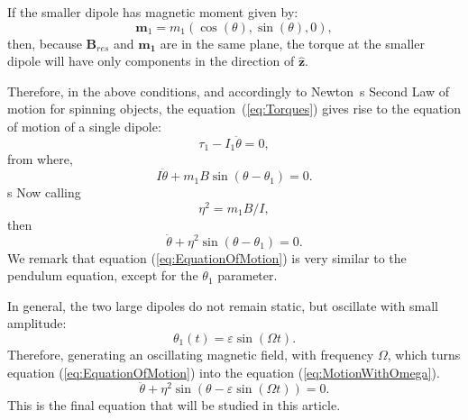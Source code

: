 If the smaller dipole has magnetic moment given by:
\begin{equation}
    \boldsymbol{m}_1 = m_1 (\cos(\theta), \sin(\theta), 0),
    \label{eq:MagneticMoment}
\end{equation}
then, because $\boldsymbol{B}_{res}$ and $\boldsymbol{m_1}$ are in the same plane, the torque at the smaller dipole will have only components in the direction of $\boldsymbol{\hat{z}}$.

Therefore, in the above conditions, and accordingly to Newton~\textquotesingle s Second Law of motion for spinning objects, the equation~(\ref{eq:Torques}) gives rise to the equation of motion of a single dipole:
\begin{equation}
        \tau_1 - I_1 \ddot{\theta} = 0,
\end{equation}
from where, 
\begin{equation}    
        I \ddot{\theta} + m_1 B \sin(\theta - \theta_1) = 0.        
\end{equation}s 
Now calling
\begin{equation}
    \eta^2 = m_1 B/I,
\end{equation} 
then
\begin{equation}
    \ddot{\theta} +\eta^2 \sin(\theta - \theta_1) = 0.
    \label{eq:EquationOfMotion}
\end{equation}
We remark that equation (\ref{eq:EquationOfMotion}) is very similar to the pendulum equation, except for the $\theta_1$ parameter.


In general, the two large dipoles do not remain static, but oscillate with small amplitude:
\begin{equation}
    \theta_1(t) = \varepsilon \sin(\Omega t).
\end{equation}
Therefore, generating an oscillating magnetic field, with frequency $\Omega$, which turns equation (\ref{eq:EquationOfMotion}) into the equation (\ref{eq:MotionWithOmega}).
\begin{equation}
    \ddot{\theta} +\eta^2 \sin(\theta - \varepsilon \sin(\Omega t)) = 0.
    \label{eq:MotionWithOmega}
\end{equation}
This is the final equation that will be studied in this article.

